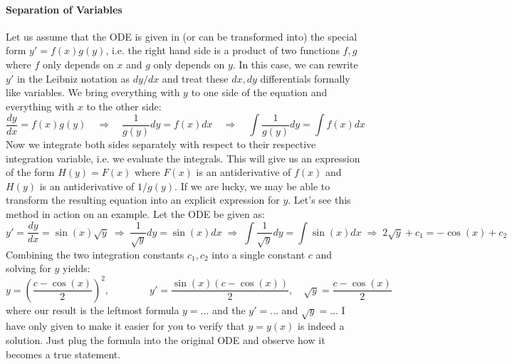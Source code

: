 \paragraph{Separation of Variables}
Let us assume that the ODE is given in (or can be transformed into) the special form $y' = f(x) g(y)$, i.e. the right hand side is a product of two functions $f,g$ where $f$ only depends on $x$ and $g$ only depends on $y$. In this case, we can rewrite $y'$ in the Leibniz notation as $dy / dx$ and treat these $dx, dy$ differentials formally like variables. We bring everything with $y$ to one side of the equation and everything with $x$ to the other side:
\begin{equation}
\frac{dy}{dx} = f(x) g(y) 
\quad \Rightarrow \quad
\frac{1}{g(y)} dy = f(x) dx
\quad \Rightarrow \quad
\int \frac{1}{g(y)} dy = \int f(x) dx
\end{equation}
Now we integrate both sides separately with respect to their respective integration variable, i.e. we evaluate the integrals. This will give us an expression of the form $H(y) = F(x)$ where $F(x)$ is an antiderivative of $f(x)$ and $H(y)$ is an antiderivative of $1/g(y)$. If we are lucky, we may be able to transform the resulting equation into an explicit expression for $y$. Let's see this method in action on an example. Let the ODE be given as:
\begin{equation}
y' = \frac{dy}{dx} = \sin(x) \sqrt{y} 
\; \Rightarrow \; 
\frac{1}{\sqrt{y}} dy = \sin(x) dx
\; \Rightarrow \;
\int \frac{1}{\sqrt{y}} dy = \int \sin(x) dx
\; \Rightarrow \;
2 \sqrt{y} + c_1 = - \cos(x) + c_2
\end{equation}
Combining the two integration constants $c_1, c_2$ into a single constant $c$ and solving for $y$ yields:
\begin{equation}
y = \left( \frac{c - \cos(x)}{2} \right)^2,
\qquad \qquad
y' = \frac{\sin(x) (c-\cos(x))}{2},
\quad
\sqrt{y} = \frac{c - \cos(x)}{2}
\end{equation}
where our result is the leftmost formula $y = \ldots$ and the $y' = \ldots$ and $\sqrt{y} = \ldots$ I have only given to make it easier for you to verify that $y = y(x)$ is indeed a solution. Just plug the formula into the original ODE and observe how it becomes a true statement.

\medskip
[Q: Can it happen that the so found equation for $y$ cannot be solved explicitly for $y$, i.e. can we arrive at an implicit equation for $y$? I think so. ToDo: Try to find an example, where this happens. Maybe something where we get an expression $H(y) = y + \sin(y)$. I think, the function $y(x)$ that we are interested in will be the inverse of $H$. I think, the solution is $y(x) = H^{-1}(F(x))$]


